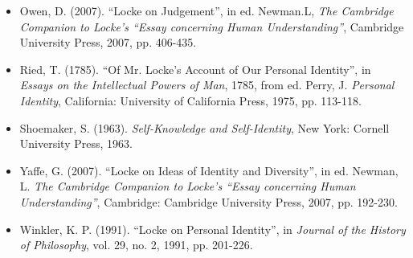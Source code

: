 \documentclass[a4j,oneside]{jsbook}
\begin{document}
\begin{itemize}
\item{} Owen, D. (2007). “Locke on Judgement”, in ed. Newman.L, {\itshape The Cambridge Companion to Locke's “Essay concerning Human Understanding”}, Cambridge University Press, 2007, pp. 406-435.
\item{} Ried, T. (1785). “Of Mr. Locke’s Account of Our Personal Identity”, in {\itshape Essays on the Intellectual Powers of Man}, 1785,  from ed. Perry, J. {\itshape Personal Identity}, California: University of California Press, 1975, pp. 113-118.
\item{} Shoemaker, S. (1963). {\itshape Self-Knowledge and Self-Identity}, New York: Cornell University Press, 1963.
\item{} Yaffe, G. (2007). “Locke on Ideas of Identity and Diversity”, in ed. Newman, L. {\itshape The Cambridge Companion to Locke's “Essay concerning Human Understanding”}, Cambridge: Cambridge University Press, 2007, pp. 192-230.
\item{} Winkler, K. P. (1991). “Locke on Personal Identity”, in {\itshape Journal of the History of Philosophy}, vol. 29, no. 2, 1991, pp. 201-226.

\end{itemize}
\end{document}
